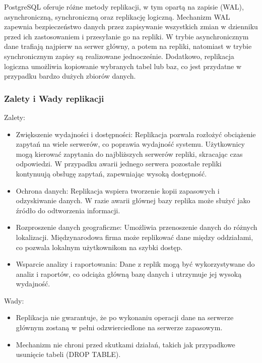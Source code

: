 \documentclass[a4paper,11pt,openany,english]{sphinxmanual}
\begin{document}
\sphinxAtStartPar
PostgreSQL oferuje różne metody replikacji, w tym opartą na zapisie (WAL), asynchroniczną, synchroniczną oraz replikację logiczną. Mechanizm WAL zapewnia bezpieczeństwo danych przez zapisywanie wszystkich zmian w dzienniku przed ich zastosowaniem i przesyłanie go na repliki. W trybie asynchronicznym dane trafiają najpierw na serwer główny, a potem na repliki, natomiast w trybie synchronicznym zapisy są realizowane jednocześnie. Dodatkowo, replikacja logiczna umożliwia kopiowanie wybranych tabel lub baz, co jest przydatne w przypadku bardzo dużych zbiorów danych.


\subsubsection{Zalety i Wady replikacji}
\label{\detokenize{rozdzial2/Wydajnosc-Skalowanie-i-Replikacja/index:zalety-i-wady-replikacji}}
\sphinxAtStartPar
Zalety:
\begin{itemize}
\item {} 
\sphinxAtStartPar
Zwiększenie wydajności i dostępności: Replikacja pozwala rozłożyć obciążenie zapytań na wiele serwerów, co poprawia wydajność systemu. Użytkownicy mogą kierować zapytania do najbliższych serwerów repliki, skracając czas odpowiedzi. W przypadku awarii jednego serwera pozostałe repliki kontynuują obsługę zapytań, zapewniając wysoką dostępność.

\item {} 
\sphinxAtStartPar
Ochrona danych: Replikacja wspiera tworzenie kopii zapasowych i odzyskiwanie danych. W razie awarii głównej bazy replika może służyć jako źródło do odtworzenia informacji.

\item {} 
\sphinxAtStartPar
Rozproszenie danych geograficzne: Umożliwia przenoszenie danych do różnych lokalizacji. Międzynarodowa firma może replikować dane między oddziałami, co pozwala lokalnym użytkownikom na szybki dostęp.

\item {} 
\sphinxAtStartPar
Wsparcie analizy i raportowania: Dane z replik mogą być wykorzystywane do analiz i raportów, co odciąża główną bazę danych i utrzymuje jej wysoką wydajność.

\end{itemize}

\sphinxAtStartPar
Wady:
\begin{itemize}
\item {} 
\sphinxAtStartPar
Replikacja nie gwarantuje, że po wykonaniu operacji dane na serwerze głównym zostaną w pełni odzwierciedlone na serwerze zapasowym.

\item {} 
\sphinxAtStartPar
Mechanizm nie chroni przed skutkami działań, takich jak przypadkowe usunięcie tabeli (DROP TABLE).

\end{itemize}
\end{document}
